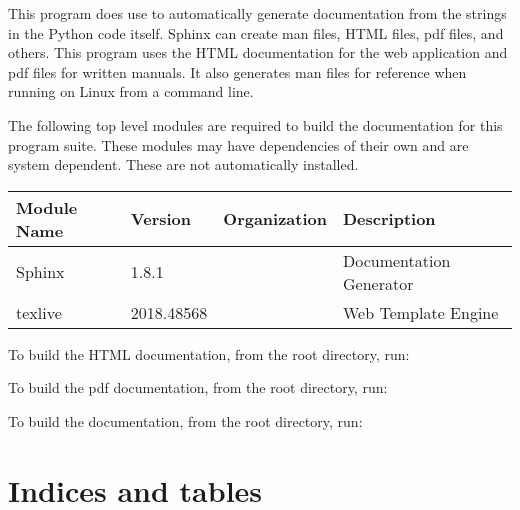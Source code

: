 \documentclass[letterpaper,10pt,english]{sphinxmanual}
\begin{document}
This program does use  to automatically generate
documentation from the  strings in the Python code itself.
Sphinx can create man files, HTML files, pdf files, and others.  This
program uses the HTML documentation for the web application and pdf
files for written manuals.  It also generates man files for reference
when running on Linux from a command line.

The following top level modules are required to build the documentation for this
program suite.  These modules may have dependencies of their own and
are system dependent.  These are not automatically installed.


\begin{savenotes}\sphinxattablestart
\centering
\begin{tabulary}{\linewidth}[t]{|T|T|T|T|}
\hline

Module Name
&
Version
&
Organization
&
Description
\\
\hline
Sphinx
&
1.8.1
&
&
Documentation Generator
\\
\hline
texlive
&
2018.48568
&
&
Web Template Engine
\\
\hline
\end{tabulary}
\par
\sphinxattableend\end{savenotes}

To build the HTML documentation, from the root directory, run:
\begin{quote}

\end{quote}

To build the pdf documentation, from the root directory, run:
\begin{quote}

\end{quote}

To build the  documentation, from the root directory, run:
\begin{quote}

\end{quote}


\chapter{Indices and tables}
\label{\detokenize{index:indices-and-tables}}\begin{quote}

\end{quote}
\end{document}
